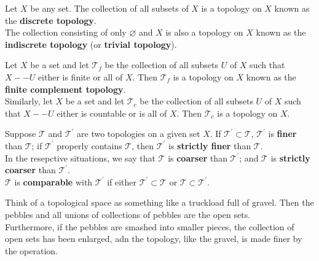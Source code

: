 \begin{eg}
Let $X$ be any set. The collection of all subsets of $X$ is a topology on $X$ known as the \textbf{discrete topology}. \\

The collection consisting of only $\varnothing$ and $X$ is also a topology on $X$ known as the \textbf{indiscrete topology} (or \textbf{trivial topology}).
\end{eg}

\begin{eg}
Let $X$ be a set and let $\mathscr{T}_f$ be the collection of all subsets $U$ of $X$ such that $X--U$ either is finite or all of $X$. Then $\mathscr{T}_f$ is a topology on $X$
known as the \textbf{finite complement topology}. \\

Similarly, let $X$ be a set and let $\mathscr{T}_c$ be the collection of all subsets $U$ of $X$ such that $X--U$ either is countable or is all of $X$. 
Then $\mathscr{T}_c$ is a topology on $X$.
\end{eg}

\begin{definition}
Suppose $\mathscr{T}$ and $\mathscr{T}^{\prime}$ are two topologies on a given set $X$. If $\mathscr{T}^{\prime} \subset \mathscr{T}$, $\mathscr{T}^{\prime}$ is \textbf{finer} than $\mathscr{T}$;
if $\mathscr{T}^{\prime}$ properly contains $\mathscr{T}$, then $\mathscr{T}^{\prime}$ is \textbf{strictly finer} than $\mathscr{T}$. \\

In the resepctive situations, we say that $\mathscr{T}$ is \textbf{coarser} than $\mathscr{T^{\prime}}$;
and $\mathscr{T}$ is \textbf{strictly coarser} than $\mathscr{T}^{\prime}$. \\

$\mathscr{T}$ is \textbf{comparable} with $\mathscr{T}^{\prime}$ if either $\mathscr{T}^{\prime} \subset \mathscr{T}$ or $\mathscr{T} \subset \mathscr{T}^{\prime}$.
\end{definition}

\begin{intuition}
Think of a topological space as something like a truckload full of gravel. Then the pebbles and all unions of collections of pebbles are the open sets.\\

Furthermore, if the pebbles are smashed into smaller pieces, the collection of open sets has been enlarged, adn the topology, like the gravel, is made finer by the operation.
\end{intuition}

